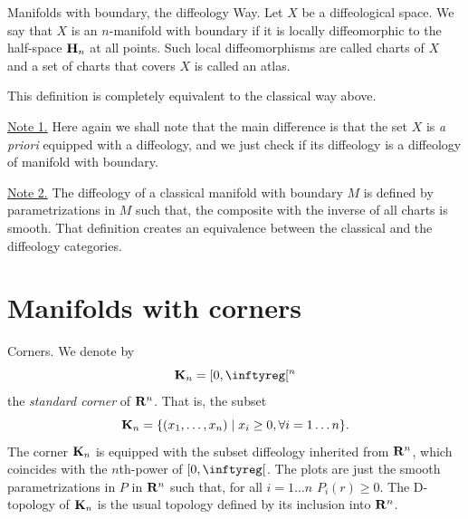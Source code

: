 \begin{Article}{Manifolds with boundary, the diffeology Way.}{}
  \label{Diffeology-of-manifolds-with-boundary}
  Let $X$ be a diffeological space.
  We say that $X$ is an $n$-manifold with boundary if it is locally diffeomorphic to the half-space ${\mathbf H}_n$ at all points.
  Such local diffeomorphisms are called charts of $X$ and a set of charts that covers $X$ is called an atlas.

   This definition is completely equivalent to the classical way above.

  \uline{Note 1.} Here again we shall note that the main difference is that the set $X$ is \emph{a priori} equipped with a diffeology,
  and we just check if its diffeology is a diffeology of manifold with boundary.

  \uline{Note 2.} The diffeology of a classical manifold with boundary $M$ is defined by parametrizations in $M$ such that,
  the composite with the inverse of all charts is smooth.
  That definition creates an equivalence between the classical and the diffeology categories.
\end{Article} %

\section{Manifolds with corners}

\begin{Article}{Corners.}{}
  \label{Corners}
  We denote by
  $$%
    \KK_n = \LeftClosedInterval{0,\infty}^n
  $$%
  the \emph{standard corner} of $\mathbf{R}^n$.
  That is,
  the subset
  $$%
    \KK_n = \{ (x_1,\dots,x_n) \mid x_i \geq 0, \forall i = 1 \dots n \}.
  $$%
  The corner ${\mathbf K}_n$ is equipped with the subset diffeology inherited from $\mathbf{R}^n$,
  which coincides with the $n$th-power of $\LeftClosedInterval{0,\infty}$.
  The plots are just the smooth parametrizations in $P$ in $\mathbf{R}^n$ such that,
  for all $i = 1 \dots n$ $P_i(r) \geq 0$.
  The D-topology of ${\mathbf K}_n$ is the usual topology defined by its inclusion into $\mathbf{R}^n$.
\end{Article} %

